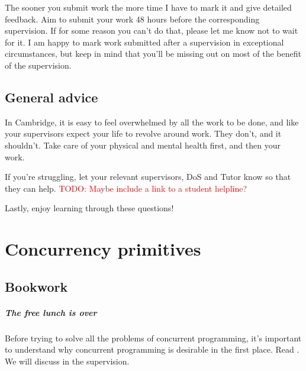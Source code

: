 \documentclass[12pt,a4paper,oneside,openright]{report}
\newcommand{\question}[2]{\paragraph{#1} #2}
\newcommand{\todo}[1]{\textcolor{red}{TODO: #1}}
\begin{document}
The sooner you submit work the more time I have to mark it and give
detailed feedback. Aim to submit your work 48 hours before the
corresponding supervision. If for some reason you can't do that,
please let me know not to wait for it. I am happy to mark work
submitted after a supervision in exceptional circumstances, but keep
in mind that you'll be missing out on most of the benefit of the
supervision.

\section*{General advice}

In Cambridge, it is easy to feel overwhelmed by all the work to be
done, and like your supervisors expect your life to revolve around
work. They don't, and it shouldn't. Take care of your physical and
mental health first, and then your work.

If you're struggling, let your relevant supervisors, DoS and Tutor
know so that they can help. \todo{Maybe include a link to a student
  helpline?}

Lastly, enjoy learning through these questions!

\newpage

\tableofcontents



\chapter{Concurrency primitives}
\pagestyle{headings} 

\section{Bookwork}

\question{The free lunch is over}{Before trying to solve all the
  problems of concurrent programming, it's important to understand why
  concurrent programming is desirable in the first place. Read
  \cite{FreeLunchIsOver}. We will discuss in the supervision.}
\end{document}
